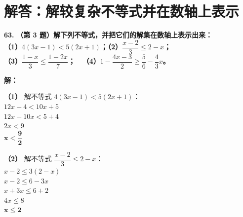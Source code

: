 \newpage



\newpage

\section{解答：解较复杂不等式并在数轴上表示}

\vspace{0.6cm}

\textbf{\LARGE 63.} \textbf{（第 3 题）解下列不等式，并把它们的解集在数轴上表示出来：\\
（1）$4(3x-1) < 5(2x+1)$；\qquad\quad （2）$\dfrac{x-2}{3} \leqslant 2-x$；\\[1.5ex]
（3）$\dfrac{1-x}{3} \leqslant \dfrac{1-2x}{7}$；\qquad\qquad\,\,\,\, （4）$1 - \dfrac{4x-3}{2} \geqslant \dfrac{5}{6} - \dfrac{4}{3}x$。}

\vspace{0.4cm}
\textbf{解：}

\textbf{（1）} 解不等式 $4(3x-1) < 5(2x+1)$：\\
\hspace*{0.8cm} $12x - 4 < 10x + 5$\\
\hspace*{0.8cm} $12x - 10x < 5 + 4$\\
\hspace*{0.8cm} $2x < 9$\\
\hspace*{0.8cm} $\boldsymbol{x < \dfrac{9}{2}}$

\textbf{（2）} 解不等式 $\dfrac{x-2}{3} \leqslant 2-x$：\\
\hspace*{0.8cm} $x - 2 \leqslant 3(2 - x)$\\
\hspace*{0.8cm} $x - 2 \leqslant 6 - 3x$\\
\hspace*{0.8cm} $x + 3x \leqslant 6 + 2$\\
\hspace*{0.8cm} $4x \leqslant 8$\\
\hspace*{0.8cm} $\boldsymbol{x \leqslant 2}$

